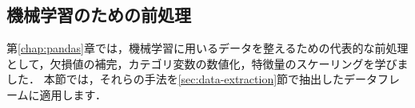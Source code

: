 

\subsection{機械学習のための前処理}

第\ref{chap:pandas}章では，機械学習に用いるデータを整えるための代表的な前処理として，欠損値の補完，カテゴリ変数の数値化，特徴量のスケーリングを学びました．
本節では，それらの手法を\ref{sec:data-extraction}節で抽出したデータフレームに適用します．


